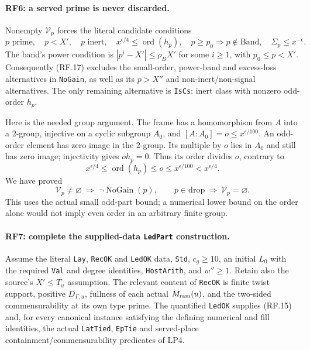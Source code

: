 \documentclass[11pt,a4paper]{article}
\numberwithin{equation}{section}
\theoremstyle{remark}\newtheorem{remark}[theorem]{Remark}
\begin{document}
\paragraph{RF6: a served prime is never discarded.}
Nonempty $\mathcal V_p$ forces the literal candidate conditions
\[
 p\text{ prime},\quad p<X',\quad p\text{ inert},\quad
 x^{\epsilon/4}\leq\operatorname{ord}(h_p),\quad
 p\geq p_0\Longrightarrow p\notin\mathrm{Band},\quad
                         \Sigma_p\leq x^{-\epsilon}.           \tag{RF.17}
\]
The band's power condition is
$|p^i-X'|\leq\rho_B X'$ for some $i\geq1$, with $p_0\leq p<X'$.
Consequently (RF.17) excludes the small-order, power-band and excess-loss
alternatives in \texttt{NoGain}, as well as its $p>X''$ and
non-inert/non-signal alternatives. The only remaining alternative is
\texttt{IsCs}: inert class with nonzero odd-order $h_p$.

Here is the needed group argument. The frame has a homomorphism from
$A$ into a $2$-group, injective on a cyclic subgroup $A_0$, and
$[A:A_0]=o\leq x^{\epsilon/100}$. An odd-order element has zero image
in the $2$-group. Its multiple by $o$ lies in $A_0$ and still has zero
image; injectivity gives $oh_p=0$. Thus its order divides $o$, contrary to
\[
 x^{\epsilon/4}\leq\operatorname{ord}(h_p)\leq o
                 \leq x^{\epsilon/100}<x^{\epsilon/4}.
\]
We have proved
\[
 \mathcal V_p\ne\varnothing\ \Longrightarrow\
 \neg\operatorname{NoGain}(p),\qquad
 p\in\mathrm{drop}\ \Longrightarrow\ \mathcal V_p=\varnothing.
                                                               \tag{RF.18}
\]
This uses the actual small odd-part bound; a numerical lower bound on the
order alone would not imply even order in an arbitrary finite group.

\paragraph{RF7: complete the supplied-data \texttt{LedPart} construction.}
Assume the literal \texttt{Lay}, \texttt{RecOK} and \texttt{LedOK} data,
\texttt{Std}, $c_g\geq10$, an initial $L_0$ with the required
\texttt{Val} and degree identities, \texttt{HostArith}, and $w''\geq1$.
Retain also the source's $X'\leq T_u$ assumption. The relevant content of
\texttt{RecOK} is finite twist support, positive $D_{\Gamma,u}$, fullness
of each actual $M_{\rm ram}(u)$, and the two-sided commensurability at
its own type prime. The quantified \texttt{LedOK} supplies (RF.15) and,
for every canonical instance satisfying the defining numerical and fill
identities, the actual \texttt{LatTied}, \texttt{EpTie} and served-place
containment/commensurability predicates of LP4.
\end{document}
